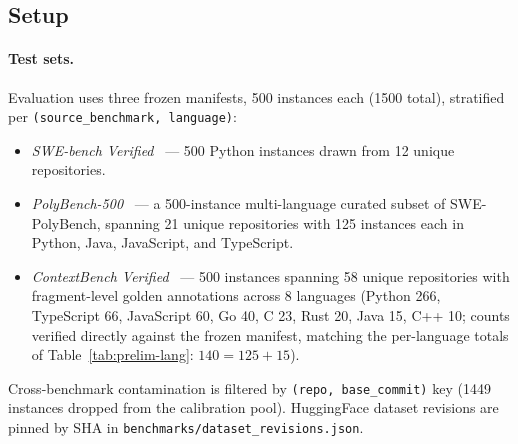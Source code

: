\documentclass[11pt, a4paper]{article}
\begin{document}
\subsection{Setup}

\paragraph{Test sets.} Evaluation uses three frozen manifests, 500 instances each (1500 total), stratified per \texttt{(source\_benchmark, language)}:
\begin{itemize}
    \item \emph{SWE-bench Verified}~\cite{jimenez2024swebench,openai2024swebenchverified} --- 500 Python instances drawn from 12 unique repositories.
    \item \emph{PolyBench-500}~\cite{rashid2025swepolybench} --- a 500-instance multi-language curated subset of SWE-PolyBench, spanning 21 unique repositories with 125 instances each in Python, Java, JavaScript, and TypeScript.
    \item \emph{ContextBench Verified}~\cite{li2026contextbench} --- 500 instances spanning 58 unique repositories with fragment-level golden annotations across 8 languages (Python 266, TypeScript 66, JavaScript 60, Go 40, C 23, Rust 20, Java 15, C++ 10; counts verified directly against the frozen manifest, matching the per-language totals of Table~\ref{tab:prelim-lang}: $140 = 125 + 15$).
\end{itemize}
Cross-benchmark contamination is filtered by \texttt{(repo, base\_commit)} key (1449 instances dropped from the calibration pool). HuggingFace dataset revisions are pinned by SHA in \texttt{benchmarks/dataset\_revisions.json}.
\end{document}
